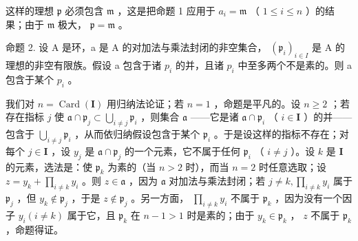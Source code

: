 这样的理想 \(\mathfrak{p}\) 必须包含 \(\mathfrak{m}\) ，这是把命题 1 应用于 \(a_{i} = \mathfrak{m}\) （ \(1 \leqslant i \leqslant n\) ）的结果；由于 \(\mathfrak{m}\) 极大， \(\mathfrak{p} = \mathfrak{m}\) 。

命题 2. 设 A 是环，a 是 A 的对加法与乘法封闭的非空集合， \((\mathfrak{p}_{i})_{i\in I}\) 是 A 的理想的非空有限族。假设 a 包含于诸 \(p_{i}\) 的并，且诸 \(p_{i}\) 中至多两个不是素的。则 a 包含于某个 \(p_{i}\) 。

我们对 \(n = \operatorname{Card}(\mathbf{I})\) 用归纳法论证；若 \(n = 1\) ，命题是平凡的。设 \(n \geqslant 2\) ；若存在指标 \(j\) 使 \(\mathfrak{a} \cap \mathfrak{p}_j \subset \bigcup_{i \neq j} \mathfrak{p}_i\) ，则集合 \(\mathfrak{a}\) ——它是诸 \(\mathfrak{a} \cap \mathfrak{p}_i\) （ \(i \in \mathbf{I}\) ）的并——包含于 \(\bigcup_{i \neq j} \mathfrak{p}_i\) ，从而依归纳假设包含于某个 \(\mathfrak{p}_i\) 。于是设这样的指标不存在；对每个 \(j \in \mathbf{I}\) ，设 \(y_j\) 是 \(\mathfrak{a} \cap \mathfrak{p}_j\) 的一个元素，它不属于任何 \(\mathfrak{p}_i\) （ \(i \neq j\) ）。设 \(k\) 是 \(\mathbf{I}\) 的元素，选法是：使 \(\mathfrak{p}_k\) 为素的（当 \(n > 2\) 时），而当 \(n = 2\) 时任意选取；设 \(z = y_k + \prod_{i \neq k} y_i\) 。则 \(z \in \mathfrak{a}\) ，因为 \(\mathfrak{a}\) 对加法与乘法封闭；若 \(j \neq k, \prod_{i \neq k} y_i\) 属于 \(\mathfrak{p}_j\) ，但 \(y_k \notin \mathfrak{p}_j\) ，于是 \(z \notin \mathfrak{p}_j\) 。另一方面， \(\prod_{i \neq k} y_i\) 不属于 \(\mathfrak{p}_k\) ，因为没有一个因子 \(y_i (i \neq k)\) 属于它，且 \(\mathfrak{p}_k\) 在 \(n - 1 > 1\) 时是素的；由于 \(y_k \in \mathfrak{p}_k\) ， \(z\) 不属于 \(\mathfrak{p}_k\) ，命题得证。


